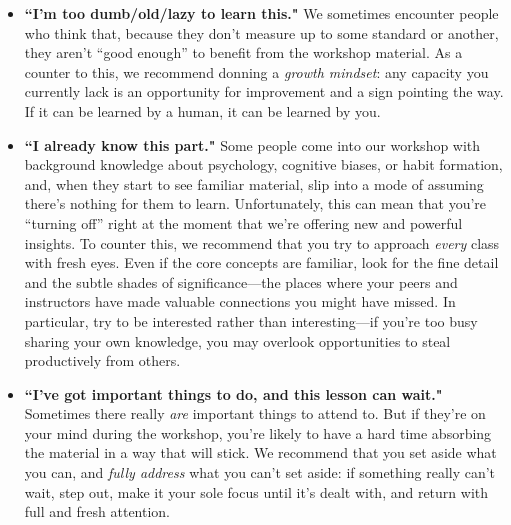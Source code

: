 \begin{itemize}
	\item \textbf{``I'm too dumb/old/lazy to learn this."} We sometimes encounter people who think that, because they don't measure up to some standard or another, they aren't ``good enough'' to benefit from the workshop material.  As a counter to this, we recommend donning a \emph{growth mindset}: any capacity you currently lack is an opportunity for improvement and a sign pointing the way.  If it can be learned by a human, it can be learned by you.	
	\item \textbf{``I already know this part."} Some people come into our workshop with background knowledge about psychology, cognitive biases, or habit formation, and, when they start to see familiar material, slip into a mode of assuming there's nothing for them to learn.  Unfortunately, this can mean that you're ``turning off'' right at the moment that we're offering new and powerful insights.  To counter this, we recommend that you try to approach \emph{every} class with fresh eyes.  Even if the core concepts are familiar, look for the fine detail and the subtle shades of significance---the places where your peers and instructors have made valuable connections you might have missed.  In particular, try to be interested rather than interesting---if you're too busy sharing your own knowledge, you may overlook opportunities to steal productively from others.
	\item \textbf{``I've got important things to do, and this lesson can wait."} Sometimes there really \emph{are} important things to attend to. But if they're on your mind during the workshop, you're likely to have a hard time absorbing the material in a way that will stick. We recommend that you set aside what you can, and \emph{fully address} what you can't set aside: if something really can't wait, step out, make it your sole focus until it's dealt with, and return with full and fresh attention.
\end{itemize}
